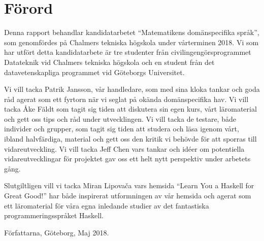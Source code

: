 \thispagestyle{plain}			%
\section*{Förord}

\begin{draft}

Denna rapport behandlar kandidatarbetet ``Matematikens domänspecifika språk'',
som genomfördes på Chalmers tekniska högskola under vårterminen 2018. Vi som har
utfört detta kandidatarbete är tre studenter från civilingengörsprogrammet
Datateknik vid Chalmers tekniska högskola och en student från det
datavetenskapliga programmet vid Göteborgs Universitet.

Vi vill tacka Patrik Jansson, vår handledare, som med sina kloka tankar och goda
råd agerat som ett fyrtorn när vi seglat på okända domänspecifika hav. Vi vill
tacka Åke Fäldt som tagit sig tiden att diskutera sin egen kurs, vårt
läromaterial och gett oss tips och råd under utvecklingen. Vi vill tacka de
testare, både individer och grupper, som tagit sig tiden att studera och läsa
igenom vårt, ibland halvfärdiga, material och gett oss den kritik vi behövde för
att sporras till vidareutveckling. Vi vill tacka Jeff Chen vars tankar och idéer
om potentiella vidareutvecklingar för projektet gav oss ett helt nytt perspektiv
under arbetets gång.

Slutgiltligen vill vi tacka Miran Lipovača vars hemsida ``Learn You a
Haskell for Great Good!'' har både inspirerat utformningen av vår hemsida och
agerat som ett läromaterial för våra egna inledande studier av det fantastiska
programmeringsspråket Haskell. 

\end{draft}

\vspace{1.5cm}
\hfill
Författarna, Göteborg, Maj 2018.

\newpage				%
\thispagestyle{empty}
\mbox{}
